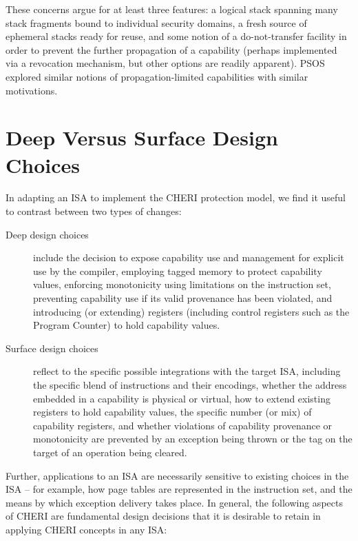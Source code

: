 These concerns argue for at least three features: a logical stack spanning many
stack fragments bound to individual security domains, a fresh source of ephemeral
stacks ready for reuse, and some notion of a do-not-transfer facility in order to
prevent the further propagation of a capability (perhaps implemented via a
revocation mechanism, but other options are readily apparent).  PSOS explored
similar notions of propagation-limited capabilities with similar motivations.

\section{Deep Versus Surface Design Choices}
\label{sec:deep-vs-surface}


In adapting an ISA to implement the CHERI protection model, we find it useful
to contrast between two types of changes:

\begin{description}
\item[Deep design choices] include the decision to expose capability use and
  management for explicit use by the compiler, employing tagged memory to
  protect capability values, enforcing monotonicity using limitations on the
  instruction set, preventing capability use if its valid provenance has been
  violated, and introducing (or extending) registers (including control
  registers such as the Program Counter) to hold capability values.

\item[Surface design choices] reflect to the specific possible integrations
  with the target ISA, including the specific blend of instructions and their
  encodings, whether the address embedded in a capability is physical or
  virtual, how to extend existing registers to hold capability values,
  the specific number (or mix) of
  capability registers, and whether violations of capability provenance or
  monotonicity are prevented by an exception being thrown or the tag on the
  target of an operation being cleared.
\end{description}

Further, applications to an ISA are necessarily sensitive to existing choices
in the ISA -- for example, how page tables are represented in the
instruction set, and the means by which exception delivery takes place.
In general, the following aspects of CHERI are fundamental design decisions
that it is desirable to retain in applying CHERI concepts in any ISA:

